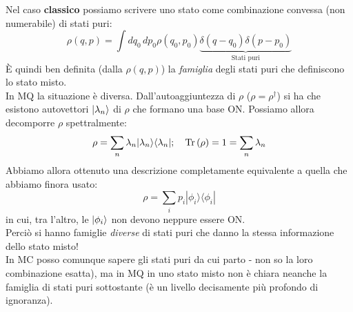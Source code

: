 \documentclass[../../FisicaTeorica.tex]{subfiles}
\begin{document}
Nel caso \textbf{classico} possiamo scrivere uno stato come combinazione convessa (non numerabile) di stati puri:
\[
\rho \left(q,p\right)=\int dq_0\,dp_0 \rho \left(q_0,p_0\right) \underbrace{\delta \left(q-q_0\right)\delta \left(p-p_0\right)}_{\text{Stati puri}}
\]
È quindi ben definita (dalla $\rho(q,p)$) la \textit{famiglia} degli stati puri che definiscono lo stato misto.\\
In MQ la situazione è diversa. Dall'autoaggiuntezza di $\rho$  ($\rho = \rho^\dag$) si ha che esistono autovettori $\ket{\lambda_n}$ di $\rho$ che formano una base ON. Possiamo allora
decomporre $\rho$ spettralmente:
\[
\rho =\sum_{n}{\lambda_n|\lambda_n\rangle\langle\lambda_n|};\quad \operatorname{Tr}\left(\rho\right)=1= \sum_{n}\lambda_n
\]
Abbiamo allora ottenuto una descrizione completamente equivalente a quella che abbiamo finora usato:
\[
\rho = \sum_{i}{p_i|\phi_i\rangle\langle\phi_i|}
\]
in cui, tra l'altro, le $\ket{\phi_i}$ non devono neppure essere ON.\\
Perciò si hanno famiglie \textit{diverse} di stati puri che danno la stessa informazione dello stato misto!\\
In MC posso comunque sapere gli stati puri da cui parto - non so la loro combinazione esatta), ma in MQ in uno stato misto non è chiara neanche la famiglia di stati puri sottostante (è un livello decisamente più profondo di ignoranza).
\end{document}
